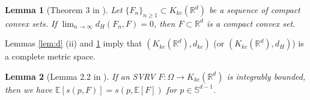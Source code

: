 \documentclass[11pt,reqno]{amsart}
\newtheorem{lemma}{Lemma}
\begin{document}
\begin{lemma}[Theorem 3 in \cite{Vi85}]\label{lem:bcc-set-conv}
Let $\{F_n\}_{n \geq 1} \subset  K_{kc}(\mathbb{R}^d)$ be a sequence of compact convex sets. %
If $\lim_{n \to \infty}d_H(F_n, F) =0$, then $F \subset \mathbb{R}^d$ is a compact convex set.
\end{lemma}

Lemmas \ref{lem:d} (ii) and \ref{lem:bcc-set-conv} imply that $(K_{kc}(\mathbb{R}^d),d_{kc})$ (or $(K_{kc}(\mathbb{R}^d), d_H)$) is a complete metric space. 

\begin{lemma}[Lemma 2.2 in \cite{Ar74}]\label{lem:int-bdd-SVRV}
If an SVRV $F: \Omega \to K_{kc}(\mathbb{R}^d)$ is integrably bounded, then we have $\mathbb{E}[s(p, F)] = s(p, \mathbb{E}[F])$ for $p \in \mathbb{S}^{d-1}$. 
\end{lemma}



\end{document}
